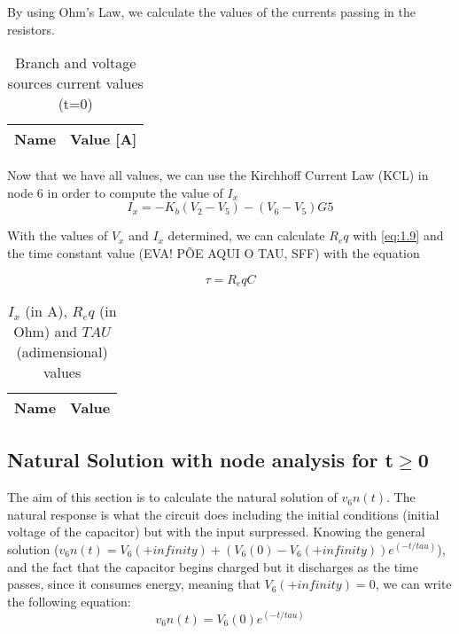 By using Ohm's Law, we calculate the values of the currents passing in the resistors.
\begin{table}[H]
  \centering
  \begin{tabular}{|l|r|}
    \hline    
    {\bf Name} & {\bf Value [A]} \\ \hline
    
  \end{tabular}
  \caption{Branch and voltage sources current values (t=0)}
  \label{tab:mat2a}
\end{table}

Now that we have all values, we can use the Kirchhoff Current Law (KCL) in node 6 in order to compute the value of $I_x$
\begin{equation}
I_x = -K_b (V_2 - V_5) - (V_6 - V_5) G5
\label{eq:1.10}
\end{equation}

With the values of $V_x$ and $I_x$ determined, we can calculate $R_eq$ with \ref{eq:1.9} and the time constant value (EVA! PÕE AQUI O TAU, SFF) with the equation

\begin{equation}
\tau = R_eq C
\label{eq:1.11}
\end{equation}

\begin{table}[H]
  \centering
  \begin{tabular}{|l|r|}
    \hline    
    {\bf Name} & {\bf Value} \\ \hline
    
  \end{tabular}
  \caption{$I_x$ (in A), $R_eq$ (in Ohm) and $TAU$ (adimensional) values}%
  \label{tab:mat2b}
\end{table}

\subsection{Natural Solution with node analysis for t$\geq$0}
The aim of this section is to calculate the natural solution of $v_6n (t)$. The natural response is what the circuit does including the initial conditions (initial voltage of the capacitor) but with the input surpressed.
Knowing the general solution ($v_6n (t) = V_6(+infinity) + (V_6(0) - V_6(+infinity))e^(-t/tau)$), and the fact that the capacitor begins charged but it discharges as the time passes, since it consumes energy, meaning that $V_6(+infinity) = 0$, we can write the following equation:
\begin{equation}
v_6n (t) = V_6(0) e^(-t/tau)
\label{eq:1.12}
\end{equation}

